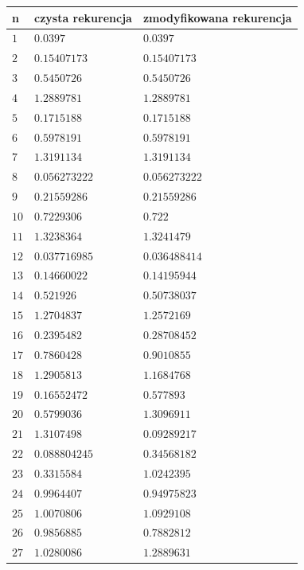 \documentclass{article}
\begin{document}
\begin{center}
	\begin{tabular}{|p{}|p{5cm}|p{5cm}|} \hline
		\textbf{n} & \textbf{czysta rekurencja} & \textbf{zmodyfikowana rekurencja}  \\
		\hline 
		$1$ & $0.0397$ & $0.0397$ \\ 
		\hline
		$2$ & $0.15407173$ & $0.15407173$ \\ 
		\hline
		$3$ & $0.5450726$ & $0.5450726$ \\ 
		\hline
		$4$ & $1.2889781$ & $1.2889781$ \\ 
		\hline
		$5$ & $0.1715188$ & $0.1715188$ \\ 
		\hline
		$6$ & $0.5978191$ & $0.5978191$ \\ 
		\hline
		$7$ & $1.3191134$ & $1.3191134$ \\ 
		\hline
		$8$ & $0.056273222$ & $0.056273222$ \\ 
		\hline
		$9$ & $0.21559286$ & $0.21559286$ \\ 
		\hline
		$10$ & $0.7229306$ & $0.722$ \\ 
		\hline
		$11$ & $1.3238364$ & $1.3241479$ \\ 
		\hline
		$12$ & $0.037716985$ & $0.036488414$ \\ 
		\hline
		$13$ & $0.14660022$ & $0.14195944$ \\ 
		\hline
		$14$ & $0.521926$ & $0.50738037$ \\ 
		\hline
		$15$ & $1.2704837$ & $1.2572169$ \\ 
		\hline
		$16$ & $0.2395482$ & $0.28708452$ \\ 
		\hline
		$17$ & $0.7860428$ & $0.9010855$ \\ 
		\hline
		$18$ & $1.2905813$ & $1.1684768$ \\ 
		\hline
		$19$ & $0.16552472$ & $0.577893$ \\ 
		\hline
		$20$ & $0.5799036$ & $1.3096911$ \\ 
		\hline
		$21$ & $1.3107498$ & $0.09289217$ \\ 
		\hline
		$22$ & $0.088804245$ & $0.34568182$ \\ 
		\hline
		$23$ & $0.3315584$ & $1.0242395$ \\ 
		\hline
		$24$ & $0.9964407$ & $0.94975823$ \\ 
		\hline
		$25$ & $1.0070806$ & $1.0929108$ \\ 
		\hline
		$26$ & $0.9856885$ & $0.7882812$ \\ 
		\hline
		$27$ & $1.0280086$ & $1.2889631$ \\ 

\end{tabular}
\end{center}
\end{document}

